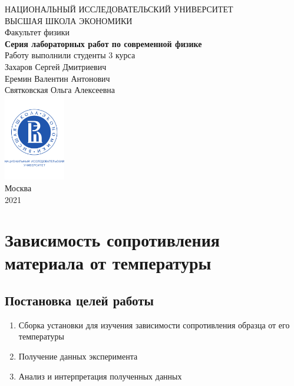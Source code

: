 \documentclass[a4paper, 12pt]{article}
\begin{document}
	\begin{titlepage}
		\begin{center}
			$$$$
			$$$$
			$$$$
			$$$$
			{\Large{НАЦИОНАЛЬНЫЙ ИССЛЕДОВАТЕЛЬСКИЙ УНИВЕРСИТЕТ}}\\
			\vspace{0.1cm}
			{\Large{ВЫСШАЯ ШКОЛА ЭКОНОМИКИ}}\\
			\vspace{0.25cm}
			{\large{Факультет физики}}\\
			\vspace{5.5cm}
			{\Huge\textbf{{Серия лабораторных работ по современной физике}}}\\%
			\vspace{1cm}
			{Работу выполнили студенты 3 курса}\\
			{Захаров Сергей Дмитриевич}\\
			{Еремин Валентин Антонович}\\
			{Святковская Ольга Алексеевна}\\
			\vfill
			\includegraphics[width = 0.2\textwidth]{HSElogo}\\
			\vfill
			Москва\\
			2021
		\end{center}
	\end{titlepage}
	
\tableofcontents

\newpage

\section{Зависимость сопротивления материала от температуры}

\subsection{Постановка целей работы}

\begin{enumerate}
	\item Сборка установки для изучения зависимости сопротивления образца от его температуры 
	
	\item Получение данных эксперимента
	
	\item Анализ и интерпретация полученных данных
\end{enumerate}
\end{document}
